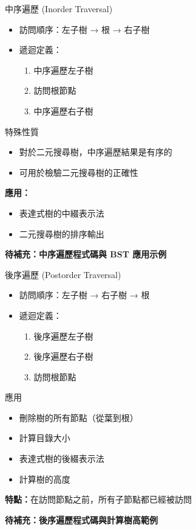 \documentclass{beamer}
\begin{document}
\begin{frame}{中序遍歷 (Inorder Traversal)}
\begin{itemize}
    \item 訪問順序：左子樹 → 根 → 右子樹
    \item 遞迴定義：
    \begin{enumerate}
        \item 中序遍歷左子樹
        \item 訪問根節點
        \item 中序遍歷右子樹
    \end{enumerate}
\end{itemize}

\vspace{1em}
\begin{block}{特殊性質}
\begin{itemize}
    \item 對於二元搜尋樹，中序遍歷結果是有序的
    \item 可用於檢驗二元搜尋樹的正確性
\end{itemize}
\end{block}

\vspace{1em}
\textbf{應用：}
\begin{itemize}
    \item 表達式樹的中綴表示法
    \item 二元搜尋樹的排序輸出
\end{itemize}

\vspace{1em}
\textbf{待補充：中序遍歷程式碼與 BST 應用示例}
\end{frame}

\begin{frame}{後序遍歷 (Postorder Traversal)}
\begin{itemize}
    \item 訪問順序：左子樹 → 右子樹 → 根
    \item 遞迴定義：
    \begin{enumerate}
        \item 後序遍歷左子樹
        \item 後序遍歷右子樹
        \item 訪問根節點
    \end{enumerate}
\end{itemize}

\vspace{1em}
\begin{block}{應用}
\begin{itemize}
    \item 刪除樹的所有節點（從葉到根）
    \item 計算目錄大小
    \item 表達式樹的後綴表示法
    \item 計算樹的高度
\end{itemize}
\end{block}

\vspace{1em}
\textbf{特點：}在訪問節點之前，所有子節點都已經被訪問

\vspace{1em}
\textbf{待補充：後序遍歷程式碼與計算樹高範例}
\end{frame}
\end{document}
